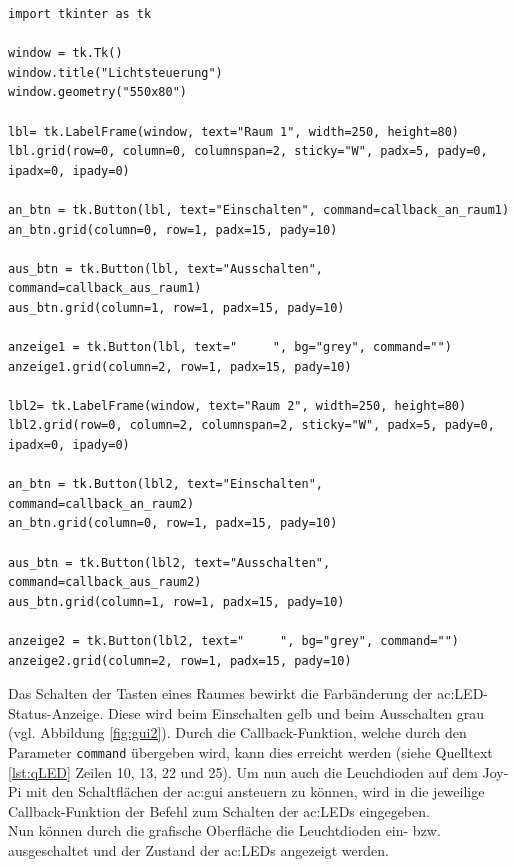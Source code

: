 \begin{lstlisting}[style=python, caption=Python-Code der verwendeten Dictionaries, label=lst:qgui]
import tkinter as tk

window = tk.Tk()
window.title("Lichtsteuerung")
window.geometry("550x80")

lbl= tk.LabelFrame(window, text="Raum 1", width=250, height=80)
lbl.grid(row=0, column=0, columnspan=2, sticky="W", padx=5, pady=0, ipadx=0, ipady=0)

an_btn = tk.Button(lbl, text="Einschalten", command=callback_an_raum1)
an_btn.grid(column=0, row=1, padx=15, pady=10)

aus_btn = tk.Button(lbl, text="Ausschalten", command=callback_aus_raum1)
aus_btn.grid(column=1, row=1, padx=15, pady=10)

anzeige1 = tk.Button(lbl, text="     ", bg="grey", command="")
anzeige1.grid(column=2, row=1, padx=15, pady=10)

lbl2= tk.LabelFrame(window, text="Raum 2", width=250, height=80)
lbl2.grid(row=0, column=2, columnspan=2, sticky="W", padx=5, pady=0, ipadx=0, ipady=0)

an_btn = tk.Button(lbl2, text="Einschalten", command=callback_an_raum2)
an_btn.grid(column=0, row=1, padx=15, pady=10)

aus_btn = tk.Button(lbl2, text="Ausschalten", command=callback_aus_raum2)
aus_btn.grid(column=1, row=1, padx=15, pady=10)

anzeige2 = tk.Button(lbl2, text="     ", bg="grey", command="")
anzeige2.grid(column=2, row=1, padx=15, pady=10)
\end{lstlisting}

\newpage

Das Schalten der Tasten eines Raumes bewirkt die Farbänderung der \gls{ac:LED}-Status-Anzeige. Diese wird beim Einschalten gelb und beim Ausschalten grau (vgl. Abbildung \ref{fig:gui2}). Durch die Callback-Funktion, welche durch den Parameter \texttt{command} übergeben wird, kann dies erreicht werden (siehe Quelltext \ref{lst:qLED} Zeilen 10, 13, 22 und 25). Um nun auch die Leuchdioden auf dem Joy-Pi mit den Schaltflächen der \gls{ac:gui} ansteuern zu können, wird in die jeweilige Callback-Funktion der Befehl zum Schalten der \gls{ac:LED}s eingegeben.\\[0,2cm]
Nun können durch die grafische Oberfläche die Leuchtdioden ein- bzw. ausgeschaltet und der Zustand der \gls{ac:LED}s angezeigt werden.

